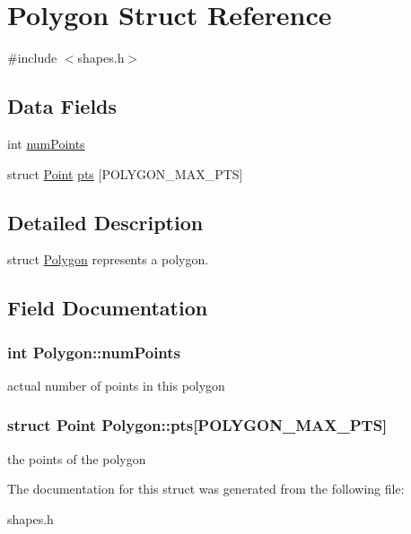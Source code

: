 \hypertarget{structPolygon}{
\section{Polygon Struct Reference}
\label{structPolygon}
}


{\ttfamily \#include $<$shapes.h$>$}\subsection*{Data Fields}
\begin{DoxyCompactItemize}
\item 
int \hyperlink{structPolygon_a7c0b11d2eedf0fb2e29d1f5a41906aa8}{numPoints}
\item 
struct \hyperlink{structPoint}{Point} \hyperlink{structPolygon_ab0ec4a53b70f1a6c6c5610ed3df27268}{pts} \mbox{[}POLYGON\_\-MAX\_\-PTS\mbox{]}
\end{DoxyCompactItemize}


\subsection{Detailed Description}
struct \hyperlink{structPolygon}{Polygon} represents a polygon. 

\subsection{Field Documentation}
\hypertarget{structPolygon_a7c0b11d2eedf0fb2e29d1f5a41906aa8}{
\subsubsection[{numPoints}]{\setlength{\rightskip}{0pt plus 5cm}int {\bf Polygon::numPoints}}}
\label{structPolygon_a7c0b11d2eedf0fb2e29d1f5a41906aa8}
actual number of points in this polygon \hypertarget{structPolygon_ab0ec4a53b70f1a6c6c5610ed3df27268}{
\subsubsection[{pts}]{\setlength{\rightskip}{0pt plus 5cm}struct {\bf Point} {\bf Polygon::pts}\mbox{[}POLYGON\_\-MAX\_\-PTS\mbox{]}}}
\label{structPolygon_ab0ec4a53b70f1a6c6c5610ed3df27268}
the points of the polygon 

The documentation for this struct was generated from the following file:\begin{DoxyCompactItemize}
\item 
shapes.h\end{DoxyCompactItemize}
